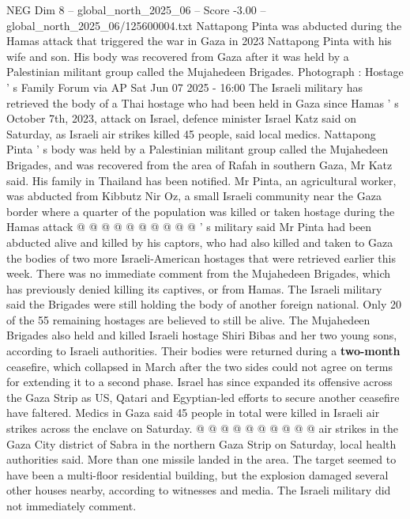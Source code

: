 \begin{textsample}{NEG Dim 8 – global\_north\_2025\_06 – Score -3.00 – global\_north\_2025\_06/125600004.txt}  \label{ex:f8_neg_030}
Nattapong Pinta was abducted during the Hamas attack that triggered the war in Gaza in 2023 Nattapong Pinta with his wife and son.
His body was recovered from Gaza after it was held by a Palestinian militant group called the Mujahedeen Brigades.
Photograph : Hostage ' s Family Forum via AP Sat Jun 07 2025 - 16:00 The Israeli military has retrieved the body of a Thai hostage who had been held in Gaza since Hamas ' s October 7th, 2023, attack on Israel, defence minister Israel Katz said on Saturday, as Israeli air strikes killed 45 people, said local medics.
Nattapong Pinta ' s body was held by a Palestinian militant group called the Mujahedeen Brigades, and was recovered from the area of Rafah in southern Gaza, Mr Katz said.
His family in Thailand has been notified.
Mr Pinta, an agricultural worker, was abducted from Kibbutz Nir Oz, a small Israeli community near the Gaza border where a quarter of the population was killed or taken hostage during the Hamas attack @ @ @ @ @ @ @ @ @ @ ' s military said Mr Pinta had been abducted alive and killed by his captors, who had also killed and taken to Gaza the bodies of two more Israeli-American hostages that were retrieved earlier this week.
There was no immediate comment from the Mujahedeen Brigades, which has previously denied killing its captives, or from Hamas.
The Israeli military said the Brigades were still holding the body of another foreign national.
Only 20 of the 55 remaining hostages are believed to still be alive.
The Mujahedeen Brigades also held and killed Israeli hostage Shiri Bibas and her two young sons, according to Israeli authorities.
Their bodies were returned during a \textbf{two-month} ceasefire, which collapsed in March after the two sides could not agree on terms for extending it to a second phase.
Israel has since expanded its offensive across the Gaza Strip as US, Qatari and Egyptian-led efforts to secure another ceasefire have faltered.
Medics in Gaza said 45 people in total were killed in Israeli air strikes across the enclave on Saturday. @ @ @ @ @ @ @ @ @ @ air strikes in the Gaza City district of Sabra in the northern Gaza Strip on Saturday, local health authorities said.
More than one missile landed in the area.
The target seemed to have been a multi-floor residential building, but the explosion damaged several other houses nearby, according to witnesses and media.
The Israeli military did not immediately comment.

\end{textsample}
